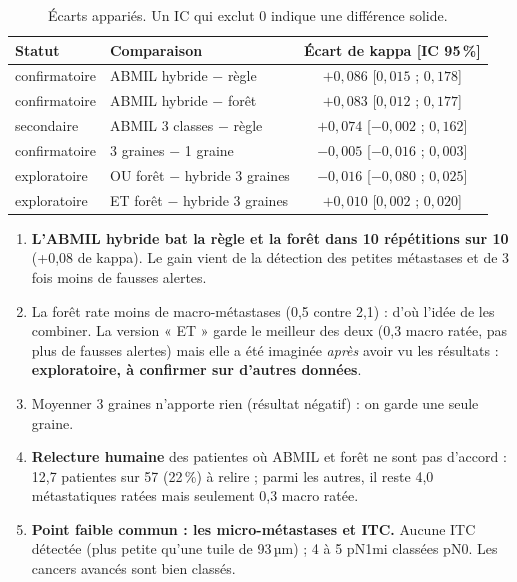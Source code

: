 \documentclass[11pt,a4paper]{article}
\begin{document}
\begin{table}[H]
\centering
\small
\begin{tabular}{llc}
\toprule
\textbf{Statut} & \textbf{Comparaison} & \textbf{Écart de kappa [IC 95\,\%]} \\
\midrule
confirmatoire & ABMIL hybride $-$ règle & $+0{,}086$ [$0{,}015$ ; $0{,}178$] \\
confirmatoire & ABMIL hybride $-$ forêt & $+0{,}083$ [$0{,}012$ ; $0{,}177$] \\
secondaire & ABMIL 3 classes $-$ règle & $+0{,}074$ [$-0{,}002$ ; $0{,}162$] \\
confirmatoire & 3 graines $-$ 1 graine & $-0{,}005$ [$-0{,}016$ ; $0{,}003$] \\
exploratoire & OU forêt $-$ hybride 3 graines & $-0{,}016$ [$-0{,}080$ ; $0{,}025$] \\
exploratoire & ET forêt $-$ hybride 3 graines & $+0{,}010$ [$0{,}002$ ; $0{,}020$] \\
\bottomrule
\end{tabular}
\caption{Écarts appariés. Un IC qui exclut 0 indique une différence solide.}
\end{table}

\begin{constat}
\begin{enumerate}
  \item \textbf{L'ABMIL hybride bat la règle et la forêt dans 10 répétitions sur 10} (+0,08 de kappa). Le gain vient de la
        détection des petites métastases et de 3 fois moins de fausses alertes.
  \item La forêt rate moins de macro-métastases (0,5 contre 2,1) : d'où l'idée de les combiner. La version « ET » garde le meilleur
        des deux (0,3 macro ratée, pas plus de fausses alertes) mais elle a été imaginée \emph{après} avoir vu les résultats :
        \textbf{exploratoire, à confirmer sur d'autres données}.
  \item Moyenner 3 graines n'apporte rien (résultat négatif) : on garde une seule graine.
  \item \textbf{Relecture humaine} des patientes où ABMIL et forêt ne sont pas d'accord : 12,7 patientes sur 57 (22\,\%) à relire ;
        parmi les autres, il reste 4,0 métastatiques ratées mais seulement 0,3 macro ratée.
  \item \textbf{Point faible commun : les micro-métastases et ITC.} Aucune ITC détectée (plus petite qu'une tuile de 93\,µm) ;
        4 à 5 pN1mi classées pN0. Les cancers avancés sont bien classés.
\end{enumerate}
\end{constat}
\end{document}
